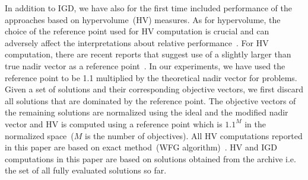 \documentclass[twocolumn,10pt]{asme2ej}
\begin{document}
{\color{blue} In addition to IGD, we have also for the first time included performance of the approaches based on hypervolume~(HV) measures. As for hypervolume, the choice of the reference point used for HV computation is crucial and can adversely affect the interpretations about relative performance~\cite{KHTYuan2016many,KHTishibuchi2010many}. For HV computation, there are recent reports that suggest use of a slightly larger than true nadir vector as a reference point~\cite{KHTYuan2016many,KHTishibuchi2010many}. In our experiments, we have used the reference point to be 1.1 multiplied by the theoretical nadir vector for problems. Given a set of solutions and their corresponding objective vectors, we first discard all solutions that are dominated by the reference point. The objective vectors of the remaining solutions are normalized using the ideal and the modified nadir vector and HV is computed using a reference point which is $1.1^M$ in the normalized space~($M$ is the number of objectives). All HV computations reported in this paper are based on exact method~(WFG algorithm)~\cite{KHTwhile2012hv}. HV and IGD computations in this paper are based on solutions obtained from the archive i.e. the set of all fully evaluated solutions so far. }
\end{document}
